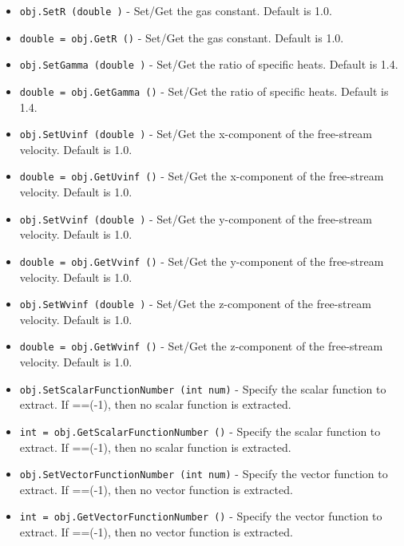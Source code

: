 \begin{itemize}
\item  \verb|obj.SetR (double )| -  Set/Get the gas constant. Default is 1.0.

\item  \verb|double = obj.GetR ()| -  Set/Get the gas constant. Default is 1.0.

\item  \verb|obj.SetGamma (double )| -  Set/Get the ratio of specific heats. Default is 1.4.

\item  \verb|double = obj.GetGamma ()| -  Set/Get the ratio of specific heats. Default is 1.4.

\item  \verb|obj.SetUvinf (double )| -  Set/Get the x-component of the free-stream velocity. Default is 1.0.

\item  \verb|double = obj.GetUvinf ()| -  Set/Get the x-component of the free-stream velocity. Default is 1.0.

\item  \verb|obj.SetVvinf (double )| -  Set/Get the y-component of the free-stream velocity. Default is 1.0.

\item  \verb|double = obj.GetVvinf ()| -  Set/Get the y-component of the free-stream velocity. Default is 1.0.

\item  \verb|obj.SetWvinf (double )| -  Set/Get the z-component of the free-stream velocity. Default is 1.0.

\item  \verb|double = obj.GetWvinf ()| -  Set/Get the z-component of the free-stream velocity. Default is 1.0.

\item  \verb|obj.SetScalarFunctionNumber (int num)| -  Specify the scalar function to extract. If ==(-1), then no scalar 
 function is extracted.

\item  \verb|int = obj.GetScalarFunctionNumber ()| -  Specify the scalar function to extract. If ==(-1), then no scalar 
 function is extracted.

\item  \verb|obj.SetVectorFunctionNumber (int num)| -  Specify the vector function to extract. If ==(-1), then no vector
 function is extracted.

\item  \verb|int = obj.GetVectorFunctionNumber ()| -  Specify the vector function to extract. If ==(-1), then no vector
 function is extracted.


\end{itemize}
